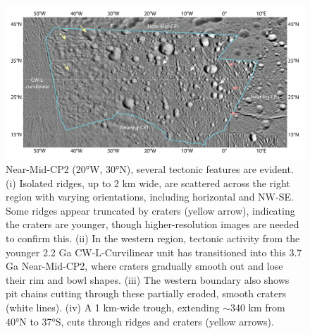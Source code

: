 \documentclass[preprint,11pt,3p,times,authoryear]{elsarticle}
\begin{document}
{\begin{figure}[t]
    \includegraphics[width=1.0\linewidth]{fig/FigS4B_Near-Mid-CP2.png}
    \caption{Near-Mid-CP2 (20°W, 30°N), several tectonic features are evident. (i) Isolated ridges, up to 2 km wide, are scattered across the right region with varying orientations, including horizontal and NW-SE. Some ridges appear truncated by craters (yellow arrow), indicating the craters are younger, though higher-resolution images are needed to confirm this. (ii) In the western region, tectonic activity from the younger 2.2 Ga CW-L-Curvilinear unit has transitioned into this 3.7 Ga Near-Mid-CP2, where craters gradually smooth out and lose their rim and bowl shapes. (iii) The western boundary also shows pit chains cutting through these partially eroded, smooth craters (white lines). (iv) A 1 km-wide trough, extending $\sim$340 km from 40°N to 37°S, cuts through ridges and craters (yellow arrows).}
    \label{fig:app_erosion2}
\end{figure}

}
\end{document}
